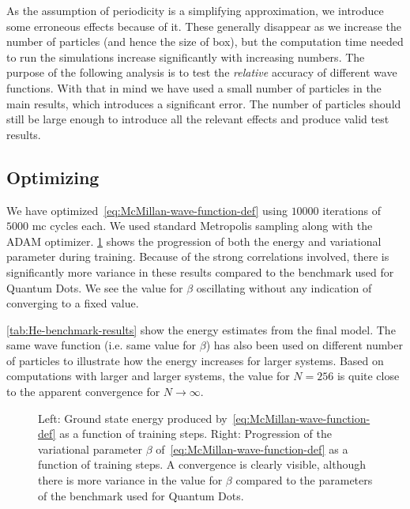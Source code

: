 \documentclass[Thesis.tex]{subfiles}
\begin{document}
\noindent As the assumption of periodicity is a simplifying approximation, we
introduce some erroneous effects because of it. These generally disappear as we
increase the number of particles (and hence the size of box), but the
computation time needed to run the simulations increase significantly with
increasing numbers. The purpose of the following analysis is to test the
\emph{relative} accuracy of different wave functions. With that in mind we have
used a small number of particles in the main results, which introduces a
significant error. The number of particles should still be large enough to
introduce all the relevant effects and produce valid test results.


\subsection{Optimizing}

We have optimized~\cref{eq:McMillan-wave-function-def} using $\num{10000}$
iterations of $\num{5000}$ \gls{mc} cycles each. We used standard Metropolis sampling
along with the ADAM optimizer. \cref{fig:He-benchmark-training} shows the
progression of both the energy and variational parameter during training.
Because of the strong correlations involved, there is significantly more
variance in these results compared to the benchmark used for Quantum Dots. We
see the value for $\beta$ oscillating without any indication of converging to a
fixed value.

\cref{tab:He-benchmark-results} show the energy estimates from the final model.
The same wave function (i.e. same value for $\beta$) has also been used on
different number of particles to illustrate how the energy increases for larger
systems. Based on computations with larger and larger systems, the value for $N
= 256$ is quite close to the apparent convergence for $N\to\infty$.

\begin{figure}[h]
  \centering
  \resizebox{\linewidth}{!}{%
    
  }
  \caption[Learning progression of McMillan wave function on $^4$He]{\label{fig:He-benchmark-training}Left: Ground state energy produced by~\cref{eq:McMillan-wave-function-def}
    as a function of training steps. Right: Progression of the variational
    parameter $\beta$ of~\cref{eq:McMillan-wave-function-def} as a function of
    training steps. A convergence is clearly visible, although there is more
    variance in the value for $\beta$ compared to the parameters of the
    benchmark used for Quantum Dots.}
\end{figure}
\end{document}
